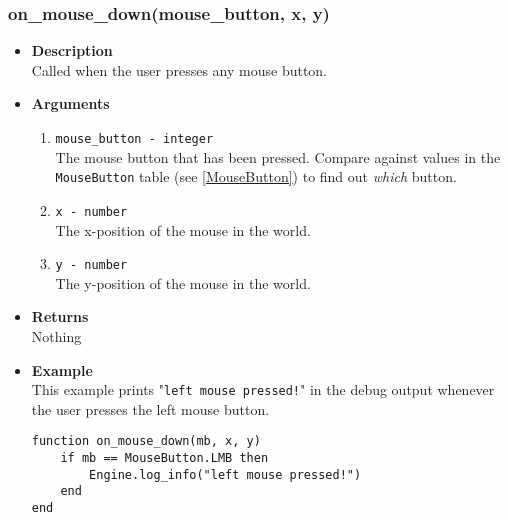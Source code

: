 \documentclass[12pt,a4paper]{article}
\begin{document}
\subsubsection{on\_mouse\_down(mouse\_button, x, y)}\label{OnMouseDown}
\begin{itemize}
	\item[]{\bf Description}
		\\ Called when the user presses any mouse button.
	\item[]{\bf Arguments}
		\begin{enumerate}
			\item{\texttt{mouse\_button - integer}} 
				\\ The mouse button that has been pressed. Compare against values in the \texttt{MouseButton} table (see \ref{MouseButton}) to find out \textit{which} button.
			\item{\texttt{x - number}}
				\\ The x-position of the mouse in the world.
			\item{\texttt{y - number}}
				\\ The y-position of the mouse in the world.
		\end{enumerate}
	\item[]{\bf Returns}
		\\ Nothing
	\item[]{\bf Example}
	\\ This example prints "\texttt{left mouse pressed!}" in the debug output whenever the user presses the left mouse button.
\begin{lstlisting}[language={[5.0]Lua}]
function on_mouse_down(mb, x, y)
    if mb == MouseButton.LMB then
        Engine.log_info("left mouse pressed!")
    end
end
\end{lstlisting}
\end{itemize}
\end{document}
